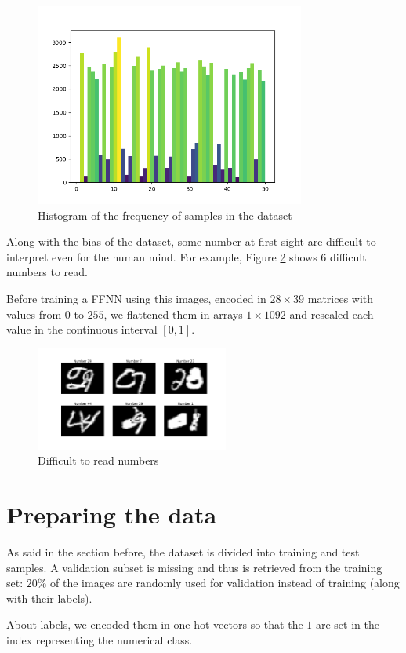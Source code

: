\documentclass[compsoc]{IEEEtran}
\begin{document}
\begin{figure}[ht!]
\centering                                                                        
\includegraphics[width=3.5in]{datahist.png}
\captionsetup{justification=centering}                                                                                                                                   
\caption{Histogram of the frequency of samples in the dataset}
\label{fig:datahist}
\end{figure}


Along with the bias of the dataset, some number at first sight are difficult to interpret even for the human mind. For example,
Figure \ref{fig:unread} shows 6 difficult numbers to read. \par

Before training a FFNN using this images, encoded in $28\times39$ matrices with values from $0$ to $255$, we flattened them in
arrays $1\times1092$ and rescaled each value in the continuous interval $[0, 1]$.

\begin{figure}[ht!]
\centering                                                                        
\includegraphics[width=2.5in]{unread.png}
\captionsetup{justification=centering}                                                                                                                                   
\caption{Difficult to read numbers}
\label{fig:unread}
\end{figure}


\section{Preparing the data}
As said in the section before, the dataset is divided into training and test samples. A validation subset is missing and thus
is retrieved from the training set: $20\%$ of the images are randomly used for validation instead of training (along with their labels). \par
About labels, we encoded them in one-hot vectors so that the $1$ are set in the index representing the numerical class.
\end{document}
